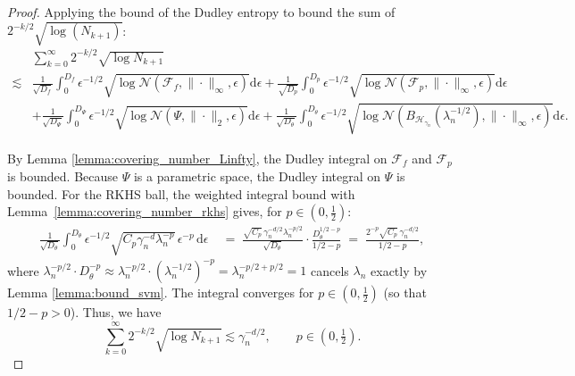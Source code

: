\documentclass[12pt]{article}
\begin{document}
\begin{proof}
Applying the bound of the Dudley entropy to bound the sum of $2^{-k/2}\sqrt{\log(N_{k+1})}$:
\begin{align*}
&\sum_{k=0}^\infty 2^{-k/2}\sqrt{\log N_{k+1}}
\;\\
\lesssim & \frac{1}{\sqrt{D_f}}\int_0^{D_f}\epsilon^{-1/2}\sqrt{\log\mathcal{N}(\mathcal{F}_f,\|\cdot\|_\infty,\epsilon)}\mathrm{d}\epsilon + \frac{1}{\sqrt{D_p}}\int_0^{D_p}\epsilon^{-1/2}\sqrt{\log\mathcal{N}(\mathcal{F}_p,\|\cdot\|_\infty,\epsilon)}\mathrm{d}\epsilon\\
& + \frac{1}{\sqrt{D_\Psi}}\int_0^{D_\Psi}\epsilon^{-1/2}\sqrt{\log\mathcal{N}(\Psi,\|\cdot\|_2,\epsilon)}\mathrm{d}\epsilon + \frac{1}{\sqrt{D_\theta}}\int_0^{D_\theta}\epsilon^{-1/2}\sqrt{\log\mathcal{N}(B_{\mathcal{H}_{\gamma_n}}(\lambda_n^{-1/2}),\|\cdot\|_\infty,\epsilon)}\mathrm{d}\epsilon.
\end{align*}

By Lemma \ref{lemma:covering_number_Linfty}, the Dudley integral on $\mathcal{F}_f$ and $\mathcal{F}_p$ is bounded. Because $\Psi$ is a parametric space, the Dudley integral on $\Psi$ is bounded. For the RKHS ball, the weighted integral bound with Lemma~\ref{lemma:covering_number_rkhs} gives, for $p\in(0,\tfrac{1}{2})$:
\begin{align*}
\frac{1}{\sqrt{D_\theta}}\int_0^{D_\theta}\!\epsilon^{-1/2}\sqrt{C_p\gamma_n^{-d}\lambda_n^{-p}}\,\epsilon^{-p}\,\mathrm{d}\epsilon
&\;=\; \frac{\sqrt{C_p}\,\gamma_n^{-d/2}\lambda_n^{-p/2}}{\sqrt{D_\theta}}\cdot\frac{D_\theta^{1/2-p}}{1/2-p}
\;=\; \frac{2^{-p}\sqrt{C_p}\,\gamma_n^{-d/2}}{1/2-p},
\end{align*}
where $\lambda_n^{-p/2}\cdot D_\theta^{-p} \approx \lambda_n^{-p/2}\cdot(\lambda_n^{-1/2})^{-p} = \lambda_n^{-p/2+p/2}=1$ cancels $\lambda_n$ exactly by Lemma \ref{lemma:bound_svm}. The integral converges for $p\in(0,\frac{1}{2})$ (so that $1/2-p > 0$). Thus, we have
\begin{equation}\label{eq:dudley_2k_half}
\sum_{k=0}^\infty 2^{-k/2}\sqrt{\log N_{k+1}} \lesssim\gamma_n^{-d/2}, \qquad p\in\left(0,\tfrac{1}{2}\right).
\end{equation}


\end{proof}
\end{document}
